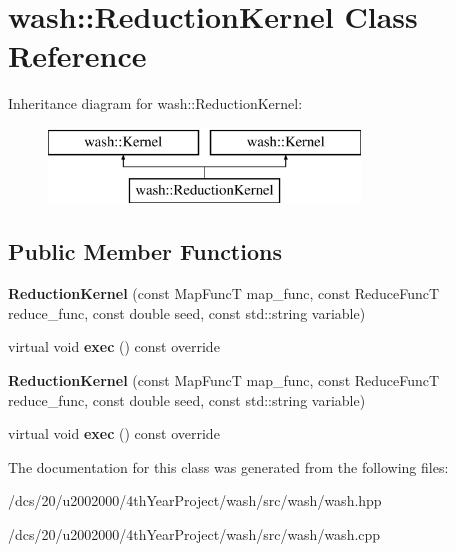 \hypertarget{classwash_1_1ReductionKernel}{}\section{wash\+:\+:Reduction\+Kernel Class Reference}
\label{classwash_1_1ReductionKernel}
Inheritance diagram for wash\+:\+:Reduction\+Kernel\+:\begin{figure}[H]
\begin{center}
\leavevmode
\includegraphics[height=2.000000cm]{classwash_1_1ReductionKernel}
\end{center}
\end{figure}
\subsection*{Public Member Functions}
\begin{DoxyCompactItemize}
\item 
\mbox{\label{classwash_1_1ReductionKernel_ab916c2db7332203aed95dbd1adfbdd8e}} 
{\bfseries Reduction\+Kernel} (const Map\+FuncT map\+\_\+func, const Reduce\+FuncT reduce\+\_\+func, const double seed, const std\+::string variable)
\item 
\mbox{\label{classwash_1_1ReductionKernel_a3ead90df8748700f40b2e6820e8e7e91}} 
virtual void {\bfseries exec} () const override
\item 
\mbox{\label{classwash_1_1ReductionKernel_ab916c2db7332203aed95dbd1adfbdd8e}} 
{\bfseries Reduction\+Kernel} (const Map\+FuncT map\+\_\+func, const Reduce\+FuncT reduce\+\_\+func, const double seed, const std\+::string variable)
\item 
\mbox{\label{classwash_1_1ReductionKernel_aa06e992c0bc5d3e97fdf7553ad583bf3}} 
virtual void {\bfseries exec} () const override
\end{DoxyCompactItemize}


The documentation for this class was generated from the following files\+:\begin{DoxyCompactItemize}
\item 
/dcs/20/u2002000/4th\+Year\+Project/wash/src/wash/wash.\+hpp\item 
/dcs/20/u2002000/4th\+Year\+Project/wash/src/wash/wash.\+cpp\end{DoxyCompactItemize}
